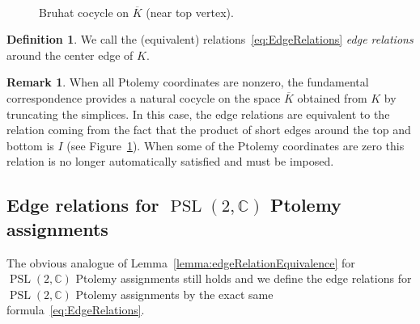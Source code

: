 \documentclass[11pt]{amsart}
\theoremstyle{plain}
\theoremstyle{definition}
\newtheorem{definition}[theorem]{Definition}
\newtheorem{remark}[theorem]{Remark}
\numberwithin{equation}{section}
\newcommand{\C}{\mathbb C}
\DeclareMathOperator{\PSL}{PSL}
\begin{document}
\begin{figure}[htb]
\hspace{0.5cm}\begin{minipage}[b]{0.55\textwidth}
\scalebox{0.8}{}
\end{minipage}
\hspace{-1cm}
\begin{minipage}[b]{0.33\textwidth}
\scalebox{0.75}{}
\end{minipage}\\
\begin{minipage}[t]{0.55\textwidth}
\caption{A Ptolemy assignment on $K$.}\label{fig:EdgeNbh}
\end{minipage}
\begin{minipage}[t]{0.44\textwidth}
\caption{Bruhat cocycle on $\overline K$ (near top vertex).}\label{fig:EdgeRelationTop}
\end{minipage}
\end{figure}


\begin{definition}\label{def:EdgeRelation}
We call the (equivalent) relations~\eqref{eq:EdgeRelations} \emph{edge relations} around the center edge of $K$.
\end{definition}


\begin{remark}
When all Ptolemy coordinates are nonzero, the fundamental correspondence provides a natural cocycle on the space $\overline K$ obtained from $K$ by truncating the simplices. In this case, the edge relations are equivalent to the relation coming from the fact that the product of short edges around the top and bottom is $I$ (see Figure~\ref{fig:EdgeRelationTop}). When some of the Ptolemy coordinates are zero this relation is no longer automatically satisfied and must be imposed.
\end{remark}






\subsection{Edge relations for $\PSL(2,\C)$ Ptolemy assignments}
The obvious analogue of Lemma~\ref{lemma:edgeRelationEquivalence} for $\PSL(2,\C)$ Ptolemy assignments still holds and we define the edge relations for $\PSL(2,\C)$ Ptolemy assignments by the exact same formula~\ref{eq:EdgeRelations}.
\end{document}

